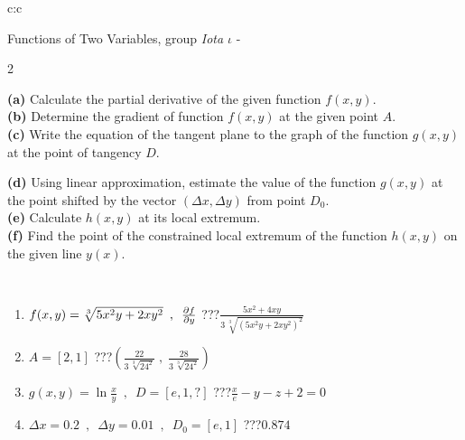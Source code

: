 \documentclass[10pt]{report}
\begin{document}
\begin{tabular}{c:c}
\begin{minipage}[c][104.5mm][t]{0.5\linewidth}
\begin{center}
\vspace{7mm}
{\huge \LARGE Functions of Two Variables, group \textit{Iota $\iota$} -}\\[5mm]
\begin{minipage}{0.95\linewidth}
\begin{center}
{\small \begin{multicols}{2} \raggedright
\textbf{(a)} Calculate the partial derivative of the given function \(f(x,y)\). \\[1mm]
\textbf{(b)} Determine the gradient of function \(f(x,y)\) at the given point \(A\). \\[1mm]
\textbf{(c)} Write the equation of the tangent plane to the graph of the function \(g(x,y)\) at the point of tangency \(D\). \par \columnbreak
\textbf{(d)} Using linear approximation, estimate the value of the function \(g(x,y)\) at the point shifted by the vector \((\Delta x, \Delta y)\) from point \(D_0\). \\[1mm]
\textbf{(e)} Calculate \(h(x,y)\) at its local extremum. \\[1mm]
\textbf{(f)} Find the point of the constrained local extremum of the function \(h(x,y)\) on the given line \(y(x)\). \\[1mm]
\end{multicols}
}
\end{center}
\end{minipage}
\\[4mm]
\begin{minipage}{0.79\linewidth}
\begin{center}
\begin{varwidth}{\linewidth}
\begin{enumerate}
\normalsizerr
\item $f(x,y) = \sqrt[3]{5x^2y + 2xy^2}\enspace , \enspace \pdv{f}{y}$\quad \dotfill\; ???\;\dotfill \quad $\frac{5x^2+4xy}{3\,\sqrt[3]{(5x^2y+2xy^2)^{2}}}$
\item $A = [2, 1]$\quad \dotfill\; ???\;\dotfill \quad $\left( \frac{22}{3\,\sqrt[3]{24^2}} \;,\; \frac{28}{3\,\sqrt[3]{24^2}} \right)$
\item $g(x,y) = \ln\frac{x}{y} \enspace , \enspace D=[e,1,?]$\quad \dotfill\; ???\;\dotfill \quad $\frac{x}{e} - y - z + 2 = 0$
\item $\Delta x = {0.2} \enspace,\enspace \Delta y = {0.01} \enspace,\enspace D_0 = [e,1]$\quad \dotfill\; ???\;\dotfill \quad $0.874$

\end{enumerate}
\end{varwidth}
\end{center}
\end{minipage}
\end{center}
\end{minipage}
\end{tabular}
\end{document}
